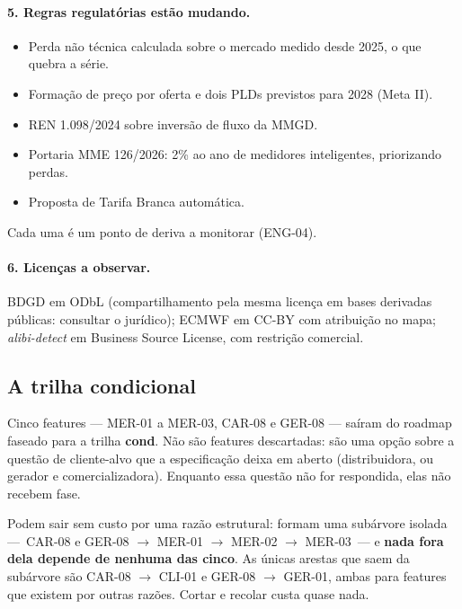\paragraph{5. Regras regulatórias estão mudando.}
\begin{itemize}
  \item Perda não técnica calculada sobre o mercado medido desde 2025, o que
    quebra a série.
  \item Formação de preço por oferta e dois PLDs previstos para 2028 (Meta II).
  \item REN 1.098/2024 sobre inversão de fluxo da MMGD.
  \item Portaria MME 126/2026: 2\% ao ano de medidores inteligentes,
    priorizando perdas.
  \item Proposta de Tarifa Branca automática.
\end{itemize}
Cada uma é um ponto de deriva a monitorar (ENG-04).

\paragraph{6. Licenças a observar.} BDGD em ODbL (compartilhamento pela mesma
licença em bases derivadas públicas: consultar o jurídico); ECMWF em CC-BY com
atribuição no mapa; \emph{alibi-detect} em Business Source License, com
restrição comercial.

\subsection*{A trilha condicional}

Cinco features --- MER-01 a MER-03, CAR-08 e GER-08 --- saíram do roadmap
faseado para a trilha \textbf{cond}. Não são features descartadas: são uma
opção sobre a questão de cliente-alvo que a especificação deixa em aberto
(distribuidora, ou gerador e comercializadora). Enquanto essa questão não for
respondida, elas não recebem fase.

Podem sair sem custo por uma razão estrutural: formam uma subárvore isolada
---~CAR-08 e GER-08 $\rightarrow$ MER-01 $\rightarrow$ MER-02 $\rightarrow$
MER-03~--- e \textbf{nada fora dela depende de nenhuma das cinco}. As únicas
arestas que saem da subárvore são CAR-08 $\rightarrow$ CLI-01 e GER-08
$\rightarrow$ GER-01, ambas para features que existem por outras razões.
Cortar e recolar custa quase nada.

